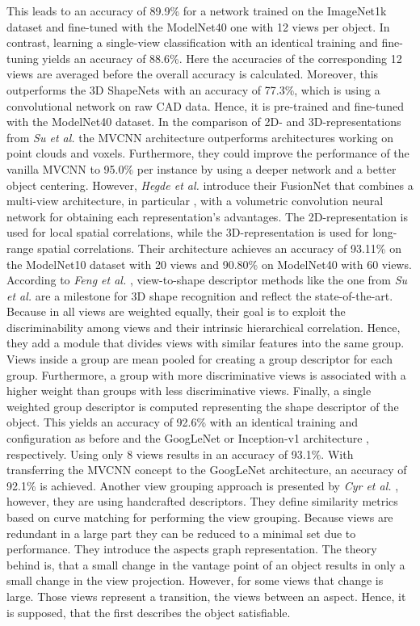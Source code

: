 This leads to an accuracy of 89.9\% for a network trained on the ImageNet1k dataset and fine-tuned with the ModelNet40 one with 12 views per object.
In contrast, learning a single-view classification with an identical training and fine-tuning yields an accuracy of 88.6\%.
Here the accuracies of the corresponding 12 views are averaged before the overall accuracy is calculated.
Moreover, this outperforms the 3D ShapeNets \cite{conf/cvpr/WuSKYZTX15} with an accuracy of 77.3\%, which is using a convolutional network on raw CAD data.
Hence, it is pre-trained and fine-tuned with the ModelNet40 dataset.
In the comparison of 2D- and 3D-representations from \textit{Su et al.} \cite{Su2018} the MVCNN architecture outperforms architectures working on point clouds and voxels.
Furthermore, they could improve the performance of the vanilla MVCNN to 95.0\% per instance by using a deeper network and a better object centering.
However, \textit{Hegde et al.} introduce their FusionNet \cite{Hegde2016FusionNet3O} that combines a multi-view architecture, in particular \cite{Su:2015:MCN:2919332.2919750}, with a volumetric convolution neural network for obtaining each representation's advantages.
The 2D-representation is used for local spatial correlations, while the 3D-representation is used for long-range spatial correlations.
Their architecture achieves an accuracy of 93.11\% on the ModelNet10 dataset with 20 views and 90.80\% on ModelNet40 with 60 views.
According to \textit{Feng et al.} \cite{Feng2018}, view-to-shape descriptor methods like the one from \textit{Su et al.} are a milestone for 3D shape recognition and reflect the state-of-the-art.
Because in \cite{Su:2015:MCN:2919332.2919750} all views are weighted equally, their goal is to exploit the discriminability among views and their intrinsic hierarchical correlation.
Hence, they add a module that divides views with similar features into the same group.
Views inside a group are mean pooled for creating a group descriptor for each group.
Furthermore, a group with more discriminative views is associated with a higher weight than groups with less discriminative views.
Finally, a single weighted group descriptor is computed representing the shape descriptor of the object.
This yields an accuracy of 92.6\% with an identical training and configuration as before and the GoogLeNet or Inception-v1 architecture \cite{szegedy2015going}, respectively.
Using only 8 views results in an accuracy of 93.1\%.
With transferring the MVCNN concept to the GoogLeNet architecture, an accuracy of 92.1\% is achieved.
Another view grouping approach is presented by \textit{Cyr et al.} \cite{Cyr2004}, however, they are using handcrafted descriptors.
They define similarity metrics based on curve matching for performing the view grouping.
Because views are redundant in a large part they can be reduced to a minimal set due to performance.
They introduce the aspects graph representation.
The theory behind is, that a small change in the vantage point of an object results in only a small change in the view projection.
However, for some views that change is large.
Those views represent a transition, the views between an aspect.
Hence, it is supposed, that the first describes the object satisfiable.